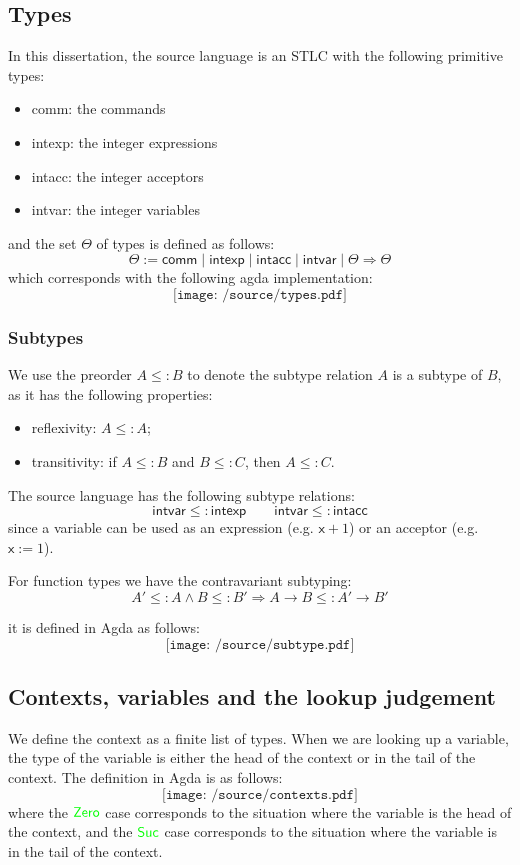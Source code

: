 \documentclass[12pt,a4paper]{report}
\theoremstyle{definition}
\newcommand{\gn}[1]{\textcolor{green}{#1}}
\begin{document}
        \subsection{Types}
        In this dissertation, the source language is an STLC with the following primitive types:
        \begin{itemize}
            \item 
                \textsf{comm}: the commands
            \item 
                \textsf{intexp}: the integer expressions
            \item 
                \textsf{intacc}: the integer acceptors
            \item 
                \textsf{intvar}: the integer variables
        \end{itemize}
        and the set $\Theta$ of types is defined as follows: 
        \[ \Theta := \textsf{comm} \mid \textsf{intexp} \mid \textsf{intacc} \mid \textsf{intvar} \mid \Theta \Rightarrow \Theta \] 
        which corresponds with the following agda implementation:
        \[\texttt{[image: /source/types.pdf]}\]

        \subsubsection{Subtypes}
        We use the preorder $A \leq: B$ to denote the subtype relation $A$ is a subtype of $B$, as it has the following properties:
        \begin{itemize}
            \item 
                reflexivity: $A \leq: A$;
            \item 
                transitivity: if $A \leq: B$ and $B \leq: C$, then $A \leq: C$.
        \end{itemize}

        The source language has the following subtype relations:
        \[ \textsf{intvar} \leq: \textsf{intexp} \qquad \textsf{intvar} \leq: \textsf{intacc} \]
        since a variable can be used as an expression (e.g. $\mathsf{x} + 1$) or an acceptor (e.g. $\mathsf{x} := 1$).

        For function types we have the contravariant subtyping:
        \[ A' \leq: A \land B \leq: B' \Rightarrow A \to B \leq: A' \to B' \]
        
        it is defined in Agda as follows:
        \[\texttt{[image: /source/subtype.pdf]}\]

        \subsection{Contexts, variables and the lookup judgement}
        We define the context as a finite list of types. When we are looking up a variable, the type of the variable is either the head of the context or in the tail of the context. The definition in Agda is as follows:
        \[\texttt{[image: /source/contexts.pdf]}\]
        where the $\gn{\mathsf{Zero}}$ case corresponds to the situation where the variable is the head of the context, and the $\gn{\mathsf{Suc}}$ case corresponds to the situation where the variable is in the tail of the context.
\end{document}
